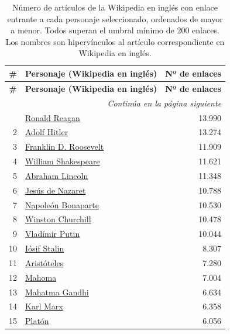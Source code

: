 \documentclass[../main.tex]{subfiles}
\begin{document}
\begin{longtable}{rlr}
\caption{Número de artículos de la Wikipedia en inglés con enlace entrante a cada personaje seleccionado, ordenados de mayor a menor. Todos superan el umbral mínimo de 200 enlaces. Los nombres son hipervínculos al artículo correspondiente en Wikipedia en inglés.}
\label{tab:backlinks_wikipedia} \\
\toprule
\textbf{\#} & \textbf{Personaje (Wikipedia en inglés)} & \textbf{Nº de enlaces} \\
\midrule
\endfirsthead
\toprule
\textbf{\#} & \textbf{Personaje (Wikipedia en inglés)} & \textbf{Nº de enlaces} \\
\midrule
\endhead
\midrule
\multicolumn{3}{r}{\footnotesize\itshape Continúa en la página siguiente} \\
\endfoot
\bottomrule
\endlastfoot
1 & \href{https://en.wikipedia.org/wiki/Ronald_Reagan}{Ronald Reagan} & 13.990 \\
2 & \href{https://en.wikipedia.org/wiki/Adolf_Hitler}{Adolf Hitler} & 13.274 \\
3 & \href{https://en.wikipedia.org/wiki/Franklin_D._Roosevelt}{Franklin D. Roosevelt} & 11.909 \\
4 & \href{https://en.wikipedia.org/wiki/William_Shakespeare}{William Shakespeare} & 11.621 \\
5 & \href{https://en.wikipedia.org/wiki/Abraham_Lincoln}{Abraham Lincoln} & 11.348 \\
6 & \href{https://en.wikipedia.org/wiki/Jesus}{Jesús de Nazaret} & 10.788 \\
7 & \href{https://en.wikipedia.org/wiki/Napoleon}{Napoleón Bonaparte} & 10.530 \\
8 & \href{https://en.wikipedia.org/wiki/Winston_Churchill}{Winston Churchill} & 10.478 \\
9 & \href{https://en.wikipedia.org/wiki/Vladimir_Putin}{Vladímir Putin} & 10.044 \\
10 & \href{https://en.wikipedia.org/wiki/Joseph_Stalin}{Iósif Stalin} & 8.307 \\
11 & \href{https://en.wikipedia.org/wiki/Aristotle}{Aristóteles} & 7.280 \\
12 & \href{https://en.wikipedia.org/wiki/Muhammad}{Mahoma} & 7.004 \\
13 & \href{https://en.wikipedia.org/wiki/Mahatma_Gandhi}{Mahatma Gandhi} & 6.634 \\
14 & \href{https://en.wikipedia.org/wiki/Karl_Marx}{Karl Marx} & 6.358 \\
15 & \href{https://en.wikipedia.org/wiki/Plato}{Platón} & 6.056 \\

\end{longtable}
\end{document}
